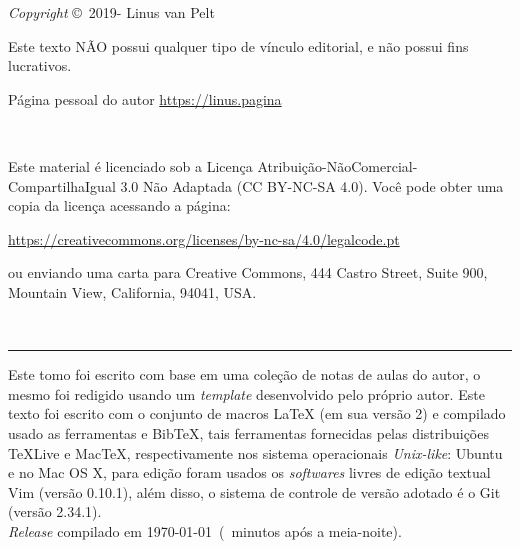 \begingroup

\newpage
\thispagestyle{empty}

\noindent \textit{Copyright} \copyright\ 2019-{\the\year} Linus van Pelt

\noindent Este texto  \textsc{NÃO}  possui qualquer tipo de vínculo editorial, e não possui fins lucrativos.

\noindent Página pessoal do autor \url{https://linus.pagina}

~\vfill

\thispagestyle{empty}

\noindent Este material é licenciado sob a Licença Atribuição-NãoComercial-CompartilhaIgual 3.0 Não Adaptada (CC BY-NC-SA 4.0).  Você pode obter uma copia da licença acessando a página: 
\begin{center}
	\url{https://creativecommons.org/licenses/by-nc-sa/4.0/legalcode.pt}
\end{center}
\noindent ou enviando uma carta para Creative Commons, 444 Castro Street, Suite 900, Mountain View, California, 94041, USA.

~\vfill

\hrule
\vspace*{1cm}

\noindent Este tomo foi escrito com base em uma coleção de notas de aulas do autor, o mesmo foi redigido usando um \textit{template} desenvolvido pelo próprio autor. Este texto foi escrito com o conjunto de macros {\LaTeX} (em sua versão 2) e compilado usado as ferramentas {\LuaLaTeX} e {Bib\TeX}, tais ferramentas fornecidas pelas distribuições {\TeX}Live e Mac{\TeX}, respectivamente  nos sistema operacionais \textit{Unix-like}: Ubuntu e no Mac OS X, para edição foram usados os \textit{softwares} livres  de edição textual Vim (versão 0.10.1), além disso, o sistema de controle de versão adotado é o Git (versão 2.34.1). \\ 

\noindent \textit{Release} compilado em \today\ (\MinutesAfterMidnight\ minutos após a meia-noite). %

\endgroup